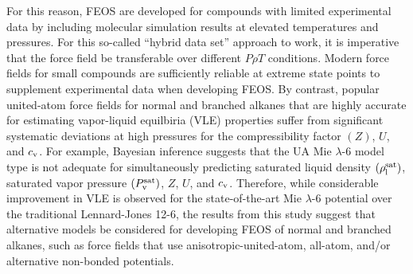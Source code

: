 \documentclass[11pt,a4paper]{article}
\begin{document}
	For this reason, FEOS are developed for compounds with limited experimental data by including molecular simulation results at elevated temperatures and pressures. For this so-called ``hybrid data set'' approach to work, it is imperative that the force field be transferable over different $P \rho T$ conditions. Modern force fields for small compounds are sufficiently reliable at extreme state points to supplement experimental data when developing FEOS. By contrast, popular united-atom force fields for normal and branched alkanes that are highly accurate for estimating vapor-liquid equilbiria (VLE) properties suffer from significant systematic deviations at high pressures for the compressibility factor $(Z)$, $U$, and $c_{\rm v}$. For example, Bayesian inference suggests that the UA Mie $\lambda$-6 model type is not adequate for simultaneously predicting saturated liquid density $(\rho_{\rm l}^{\rm sat})$, saturated vapor pressure $(P_{\rm v}^{\rm sat})$, $Z$, $U$, and $c_{\rm v}$. Therefore, while considerable improvement in VLE is observed for the state-of-the-art Mie $\lambda$-6 potential over the traditional Lennard-Jones 12-6, the results from this study suggest that alternative models be considered for developing FEOS of normal and branched alkanes, such as force fields that use anisotropic-united-atom, all-atom, and/or alternative non-bonded potentials.
			
			
\end{document}
